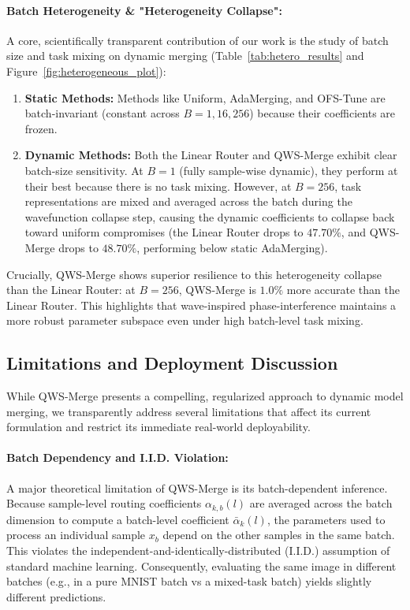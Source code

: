 \paragraph{Batch Heterogeneity \& "Heterogeneity Collapse":}
A core, scientifically transparent contribution of our work is the study of batch size and task mixing on dynamic merging (Table~\ref{tab:hetero_results} and Figure~\ref{fig:heterogeneous_plot}):
\begin{enumerate}
    \item \textbf{Static Methods:} Methods like Uniform, AdaMerging, and OFS-Tune are batch-invariant (constant across $B=1, 16, 256$) because their coefficients are frozen.
    \item \textbf{Dynamic Methods:} Both the Linear Router and QWS-Merge exhibit clear batch-size sensitivity. At $B=1$ (fully sample-wise dynamic), they perform at their best because there is no task mixing. However, at $B=256$, task representations are mixed and averaged across the batch during the wavefunction collapse step, causing the dynamic coefficients to collapse back toward uniform compromises (the Linear Router drops to $47.70\%$, and QWS-Merge drops to $48.70\%$, performing below static AdaMerging).
\end{enumerate}
Crucially, QWS-Merge shows superior resilience to this heterogeneity collapse than the Linear Router: at $B=256$, QWS-Merge is $1.0\%$ more accurate than the Linear Router. This highlights that wave-inspired phase-interference maintains a more robust parameter subspace even under high batch-level task mixing.

\subsection{Limitations and Deployment Discussion}
\label{subsec:limitations}

While QWS-Merge presents a compelling, regularized approach to dynamic model merging, we transparently address several limitations that affect its current formulation and restrict its immediate real-world deployability.

\paragraph{Batch Dependency and I.I.D. Violation:}
A major theoretical limitation of QWS-Merge is its batch-dependent inference. Because sample-level routing coefficients $\alpha_{k, b}(l)$ are averaged across the batch dimension to compute a batch-level coefficient $\bar{\alpha}_k(l)$, the parameters used to process an individual sample $x_b$ depend on the other samples in the same batch. This violates the independent-and-identically-distributed (I.I.D.) assumption of standard machine learning. Consequently, evaluating the same image in different batches (e.g., in a pure MNIST batch vs a mixed-task batch) yields slightly different predictions. 

